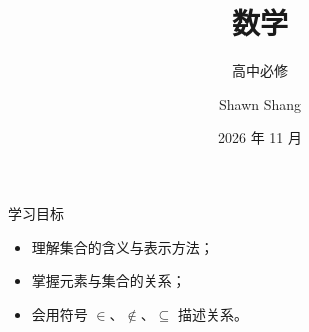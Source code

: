 \documentclass[aspectratio=169,11pt]{beamer}
\title{数学}
\subtitle{高中必修}
\author{Shawn Shang}
\date{2026 年 11 月}
\institute{数学教研组}
\begin{document}
\maketitle

\begin{frame}{学习目标}
  \begin{itemize}
    \item 理解集合的含义与表示方法；
    \item 掌握元素与集合的关系；
    \item 会用符号 $\in$、$\notin$、$\subseteq$ 描述关系。
  \end{itemize}
\end{frame}


\end{document}
